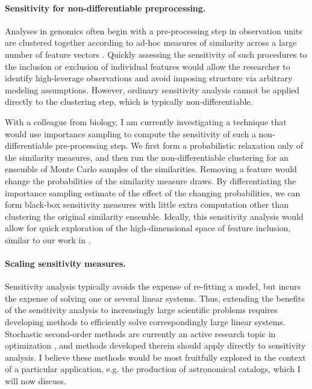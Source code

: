 \paragraph{Sensitivity for non-differentiable preprocessing.}

Analyses in genomics often begin with a pre-processing step in observation units
are clustered together according to ad-hoc measures of similarity across a large
number of feature vectors \citep{xu:2015:identification,
stuart:2019:comprehensive}.  Quickly assessing the sensitivity of such
procedures to the inclusion or exclusion of individual features would allow the
researcher to identify high-leverage observations and avoid imposing structure
via arbitrary modeling assumptions.  However, ordinary sensitivity analysis
cannot be applied directly to the clustering step, which is typically
non-differentiable.

With a colleague from biology, I am currently investigating a technique that
would use importance sampling to compute the sensitivity of such a
non-differentiable pre-processing step.  We first form a probabilistic
relaxation only of the similarity measures, and then run the non-differentiable
clustering for an ensemble of Monte Carlo samples of the similarities.  Removing
a feature would change the probabilities of the similarity measure draws.  By
differentiating the importance sampling estimate of the effect of the changing
probabilities, we can form black-box sensitivity measures with little extra
computation other than clustering the original similarity ensemble.  Ideally,
this sensitivity analysis would allow for quick exploration of the
high-dimensional space of feature inclusion, similar to our work in
\citet{giordano:2020:amip}.


\paragraph{Scaling sensitivity measures.}

Sensitivity analysis typically avoids the expense of re-fitting a model, but
incurs the expense of solving one or several linear systems.  Thus, extending
the benefits of the sensitivity analysis to increasingly large scientific
problems requires developing methods to efficiently solve correspondingly large
linear systems.  Stochastic second-order methods are currently an active
research topic in optimization \citep{agarwal:2017:secondorder,
berahas:2020:newtonsketch}, and methods developed therein should apply
directly to sensitivity analysis.  I believe these methods would be most
fruitfully explored in the context of a particular application, e.g.
the production of astronomical catalogs, which I will now discuss.

